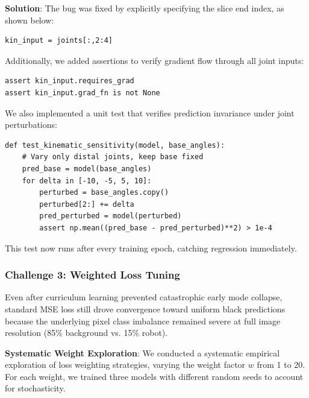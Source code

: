 \documentclass[12pt,a4paper,oneside]{report}
\begin{document}
\textbf{Solution}: The bug was fixed by explicitly specifying the slice end index, as shown below:
\begin{verbatim}
kin_input = joints[:,2:4]
\end{verbatim}

Additionally, we added assertions to verify gradient flow through all joint inputs:
\begin{verbatim}
assert kin_input.requires_grad
assert kin_input.grad_fn is not None
\end{verbatim}

We also implemented a unit test that verifies prediction invariance under joint perturbations:
\begin{verbatim}
def test_kinematic_sensitivity(model, base_angles):
    # Vary only distal joints, keep base fixed
    pred_base = model(base_angles)
    for delta in [-10, -5, 5, 10]:
        perturbed = base_angles.copy()
        perturbed[2:] += delta
        pred_perturbed = model(perturbed)
        assert np.mean((pred_base - pred_perturbed)**2) > 1e-4
\end{verbatim}
This test now runs after every training epoch, catching regression immediately.

\subsubsection{Challenge 3: Weighted Loss Tuning}
Even after curriculum learning prevented catastrophic early mode collapse, standard MSE loss still drove convergence toward uniform black predictions because the underlying pixel class imbalance remained severe at full image resolution (85\% background vs. 15\% robot).

\textbf{Systematic Weight Exploration}: We conducted a systematic empirical exploration of loss weighting strategies, varying the weight factor $w$ from 1 to 20. For each weight, we trained three models with different random seeds to account for stochasticity.
\end{document}
